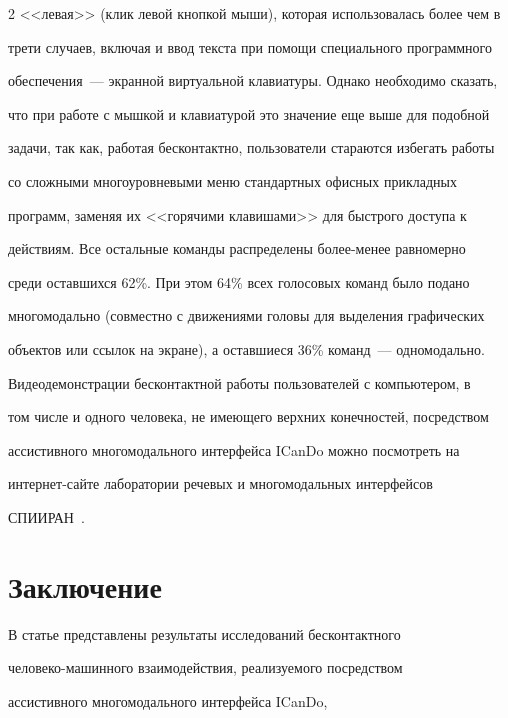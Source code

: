 \begin{multicols}{2}
<<левая>> (клик левой кнопкой мыши), которая использовалась более чем в 


трети случаев, включая и ввод текста при помощи специального программного 


обеспечения~--- экранной виртуальной клавиатуры. Однако необходимо сказать, 


что при работе с мышкой и клавиатурой это значение еще выше для подобной 


задачи, так как, работая бесконтактно, пользователи стараются избегать работы 


со сложными многоуровневыми меню стандартных офисных прикладных 


программ, заменяя их <<горячими клавишами>> для быстрого доступа к 


действиям. Все остальные команды распределены более-менее равномерно 


среди оставшихся 62\%. При этом 64\% всех голосовых команд было подано 


многомодально (совместно с движениями головы для выделения графических 


объектов или ссылок на экране), а оставшиеся 36\% команд~--- одномодально. 


  


  Видеодемонстрации бесконтактной работы пользователей с компьютером, в 


том числе и одного человека, не имеющего верхних конечностей, посредством 


ассистивного многомодального интерфейса ICanDo можно посмотреть на 


ин\-тер\-нет-сай\-те лаборатории речевых и многомодальных интерфейсов 


СПИИРАН~\cite{21kar}. 





\section{Заключение}





  В статье представлены результаты иссле\-до\-ваний бесконтактного 


  человеко-машинного вза\-и\-модействия, реализуемого посредством 


ассис\-тив\-но\-го многомодального интерфейса ICanDo,\linebreak



\end{multicols}
